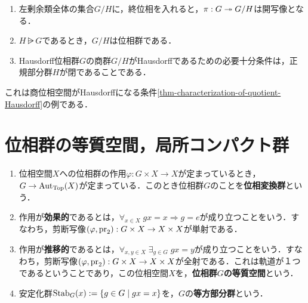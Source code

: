 \documentclass[uplatex,dvipdfmx]{jsreport}
\begin{document}
\begin{proposition}\mbox{}
    \begin{enumerate}
        \item 左剰余類全体の集合$G/H$に，終位相を入れると，$\pi:G\twoheadrightarrow G/H$は開写像となる．
        \item $H\rsub G$であるとき，$G/H$は位相群である．
        \item Hausdorff位相群$G$の商群$G/H$がHausdorffであるための必要十分条件は，正規部分群$H$が閉であることである．
    \end{enumerate}
\end{proposition}
\begin{remarks}
    これは商位相空間がHausdorffになる条件\ref{thm-characterization-of-quotient-Hausdorff}の例である．
\end{remarks}

\section{位相群の等質空間，局所コンパクト群}

\begin{definition}\mbox{}
    \begin{enumerate}
        \item 位相空間$X$への位相群の作用$\varphi:G\times X\to X$が定まっているとき，$G\to\mathrm{Aut}_{\mathrm{Top}}(X)$が定まっている．このとき位相群$G$のことを\textbf{位相変換群}という．
        \item 作用が\textbf{効果的}であるとは，$\forall_{x\in X}\;gx=x\Rightarrow g=e$が成り立つことをいう．すなわち，剪断写像$(\varphi,\mathrm{pr}_2):G\times X\to X\times X$が単射である．
        \item 作用が\textbf{推移的}であるとは，$\forall_{x,y\in X}\;\exists_{g\in G}\;gx=y$が成り立つことをいう．すなわち，剪断写像$(\varphi,\mathrm{pr}_2):G\times X\to X\times X$が全射である．これは軌道が１つであるということであり，この位相空間$X$を，\textbf{位相群$G$の等質空間}という．
        \item 安定化群$\mathrm{Stab}_G(x):=\left\{g\in G\mid gx=x\right\}$を，$G$の\textbf{等方部分群}という．
    \end{enumerate}
\end{definition}
\end{document}
